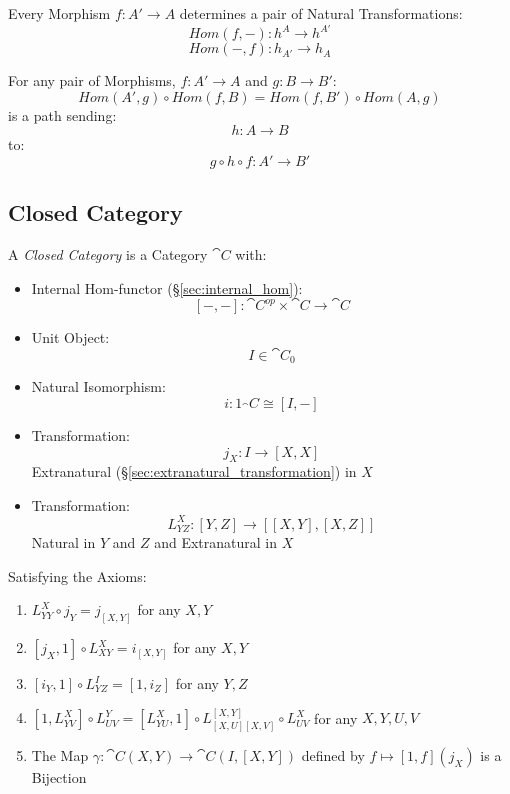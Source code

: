 Every Morphism $f : A' \rightarrow A$ determines a pair of Natural
Transformations:
\[
  Hom(f,-) : h^A \rightarrow h^{A'}
\]\[
  Hom(-,f) : h_{A'} \rightarrow h_A
\]

For any pair of Morphisms, $f : A' \rightarrow A$ and $g : B
\rightarrow B'$:
\[
  Hom(A',g) \circ Hom(f,B) = Hom(f,B') \circ Hom(A,g)
\]
is a path sending:
\[
  h : A \rightarrow B
\]
to:
\[
  g \circ h \circ f : A' \rightarrow B'
\]



\subsection{Closed Category}\label{sec:closed_category}

A \emph{Closed Category} is a Category $\cat{C}$ with:
\begin{itemize}
  \item Internal Hom-functor (\S\ref{sec:internal_hom}):
    \[
      [-,-]:\cat{C}^{op} \times \cat{C} \rightarrow \cat{C}
    \]
  \item Unit Object:
    \[
      I \in \cat{C}_0
    \]
  \item Natural Isomorphism:
    \[
      i : 1_\cat{C} \cong [I,-]
    \]
  \item Transformation:
    \[
      j_X : I \rightarrow [X,X]
    \]
    Extranatural (\S\ref{sec:extranatural_transformation}) in $X$
  \item Transformation:
    \[
      L_{Y Z}^X : [Y,Z] \rightarrow [[X,Y],[X,Z]]
    \]
    Natural in $Y$ and $Z$ and Extranatural in $X$
\end{itemize}
Satisfying the Axioms:
\begin{enumerate}
  \item $L_{Y Y}^X \circ j_Y = j_{[X,Y]}$ for any $X,Y$
  \item $[j_X,1] \circ L_{X Y}^X = i_{[X,Y]}$ for any $X,Y$
  \item $[i_Y,1] \circ L_{Y Z}^I = [1,i_Z]$ for any $Y,Z$
  \item $[1,L_{Y V}^X] \circ L_{U V}^Y = [L_{Y U}^X,1] \circ L_{[X,U]
    [X,V]}^{[X,Y]} \circ L_{U V}^X$ for any $X,Y,U,V$
  \item The Map $\gamma : \cat{C}(X,Y) \rightarrow \cat{C}(I,[X,Y])$
    defined by $f \mapsto [1,f](j_X)$ is a Bijection
\end{enumerate}

